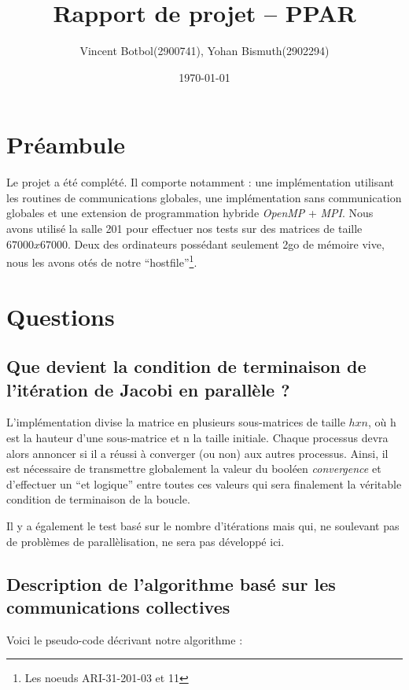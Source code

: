 \documentclass[11pt,a4paper]{report}
\title{Rapport de projet -- PPAR}
\author{Vincent Botbol(2900741), Yohan Bismuth(2902294)}
\date\today
\begin{document}
\maketitle

\chapter{Préambule}

Le projet a été complété. Il comporte notamment : une implémentation
utilisant les routines de communications globales, une implémentation
sans communication globales et une extension de programmation hybride
\emph{OpenMP} + \emph{MPI}. Nous avons utilisé la salle 201 pour
effectuer nos tests sur des matrices de taille $67000 x 67000$.  Deux
des ordinateurs possédant seulement 2go de mémoire vive, nous les
avons otés de notre ``hostfile''\footnote{Les noeuds ARI-31-201-03 et
  11}.


\chapter{Questions}

\section{Que devient la condition de terminaison de l’itération de Jacobi en parallèle ?}

L'implémentation divise la matrice en plusieurs sous-matrices de
taille $h x n$, où h est la hauteur d'une sous-matrice et n la taille
initiale. Chaque processus devra alors annoncer si il a réussi à
converger (ou non) aux autres processus. Ainsi, il est nécessaire de
transmettre globalement la valeur du booléen \emph{convergence} et
d'effectuer un ``et logique'' entre toutes ces valeurs qui sera
finalement la véritable condition de terminaison de la boucle.

Il y a également le test basé sur le nombre d'itérations mais qui, ne
soulevant pas de problèmes de parallèlisation, ne sera pas développé
ici.

\section{Description de l'algorithme basé sur les communications collectives}

Voici le pseudo-code décrivant notre algorithme :
\end{document}
